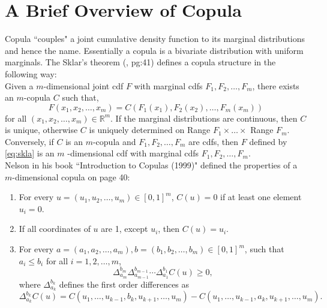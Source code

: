 \documentclass[11pt]{article}
\theoremstyle{remboldstyle}
\begin{document}
\section{A Brief Overview of Copula}
\label{sec:cop}
\noindent
Copula ``couples" a joint cumulative density function to its marginal distributions and hence the name. Essentially a copula is a bivariate distribution with uniform marginals. The Sklar's theorem (\cite{nelson:1999}, pg:41) defines a copula structure in the following way:\\
Given a $m$-dimensional joint cdf $F$ with marginal cdfs $F_1, F_2, \dots, F_m$, there exists an $m$-copula $C$ such that,
\begin{equation}
  \label{eq:skla}
  F(x_1, x_2, \dots, x_m) = C(F_1(x_1), F_2(x_2), \dots, F_m(x_m))
\end{equation}
for all $(x_1, x_2, \dots, x_m) \in \mathbb{R}^m$. If the marginal distributions are continuous, then $C$ is unique, otherwise $C$ is uniquely determined on Range $F_1 \times \dots \times$ Range $F_m$. Conversely, if $C$ is an $m$-copula and $F_1, F_2, \dots, F_m$ are cdfs, then $F$ defined by \eqref{eq:skla} is an $m$ -dimensional cdf with marginal cdfs $F_1, F_2, \dots, F_m$.\\
Nelson in his book ``Introduction to Copulas (1999)" defined the properties of a $m$-dimensional copula on page 40:
\begin{enumerate}
\item For every $u =(u_1, u_2, \dots, u_m) \in [0, 1]^m$, $C(u) = 0$ if at least
one element $u_i =0$.
\item If all coordinates of $u$ are 1, except $u_i$, then $C(u) = u_i$.
\item For every $a = (a_1, a_2, \dots, a_m), b=(b_1, b_2, \dots, b_m)
  \in [0, 1]^m$, such that $a_i \le b_i$ for all $i = 1, 2, \dots, m$,
  \begin{equation}
    \label{eq:copu}
    \Delta_{a_m}^{b_m} \Delta_{a_{m-1}}^{b_{m-1}} \cdots \Delta_{a_1}^{b_1} C(u) \ge 0,
  \end{equation}
where $\Delta_{a_k}^{b_k}$ defines the first order differences as
\[
\Delta_{a_k}^{b_k} C(u) = C(u_1, \dots, u_{k-1}, b_k, u_{k+1},\dots, u_m) -C(u_1, \dots, u_{k-1}, a_k, u_{k+1},\dots, u_m) .
\]
\end{enumerate}
\noindent
\end{document}
